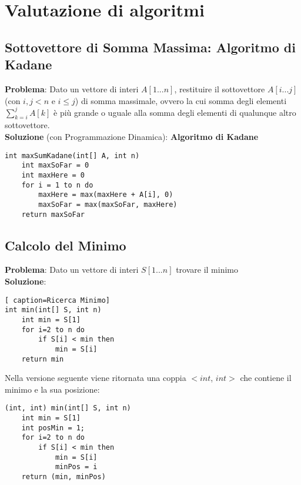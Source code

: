\documentclass[../cheatSheetAlgoritmi.tex]{subfiles}
\begin{document}
\chapter{Valutazione di algoritmi}
\section{Sottovettore di Somma Massima: Algoritmo di Kadane}
\textbf{Problema}: Dato un vettore di interi $A[1...n]$, restituire il sottovettore $A[i...j]$ (con $i, j < n$ e $i \leq j$) di somma massimale, ovvero la cui somma degli elementi $\sum_{k=i}^j A[k]$ è più grande o uguale alla somma degli elementi di qualunque altro sottovettore.\\
\textbf{Soluzione} (con Programmazione Dinamica): \textbf{Algoritmo di Kadane}
\begin{lstlisting}[caption=Kadane Algorithm]
int maxSumKadane(int[] A, int n)
	int maxSoFar = 0
	int maxHere = 0
	for i = 1 to n do
		maxHere = max(maxHere + A[i], 0)
		maxSoFar = max(maxSoFar, maxHere)
	return maxSoFar
\end{lstlisting}

\section{Calcolo del Minimo}
\textbf{Problema}: Dato un vettore di interi $S[1...n]$ trovare il minimo\\
\textbf{Soluzione}:
\begin{lstlisting}[ caption=Ricerca Minimo]
int min(int[] S, int n)
	int min = S[1]
	for i=2 to n do
		if S[i] < min then
			min = S[i]
	return min
\end{lstlisting}
Nella versione seguente viene ritornata una coppia $<$$int$, $int$$>$ che contiene il minimo e la sua posizione:
\begin{lstlisting}[caption=Ricerca Minimo ritornando gli indici]
(int, int) min(int[] S, int n)
	int min = S[1]
	int posMin = 1;
	for i=2 to n do
		if S[i] < min then
			min = S[i]
			minPos = i
	return (min, minPos)
\end{lstlisting}
\newpage
\end{document}
